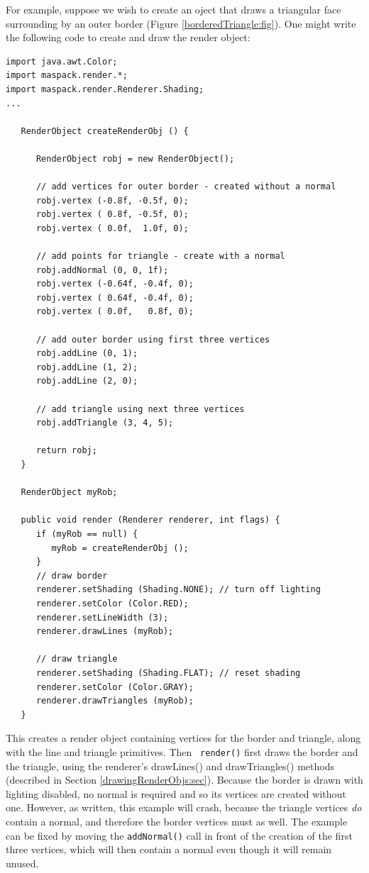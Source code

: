For example, suppose we wish to create an oject that draws a
triangular face surrounding by an outer border (Figure
\ref{borderedTriangle:fig}). One might write the following code to
create and draw the render object:
%
\begin{lstlisting}[]
import java.awt.Color;
import maspack.render.*;
import maspack.render.Renderer.Shading;
...

   RenderObject createRenderObj () {
                  
      RenderObject robj = new RenderObject();
      
      // add vertices for outer border - created without a normal
      robj.vertex (-0.8f, -0.5f, 0);
      robj.vertex ( 0.8f, -0.5f, 0);
      robj.vertex ( 0.0f,  1.0f, 0);
   
      // add points for triangle - create with a normal
      robj.addNormal (0, 0, 1f);
      robj.vertex (-0.64f, -0.4f, 0);
      robj.vertex ( 0.64f, -0.4f, 0);
      robj.vertex ( 0.0f,   0.8f, 0);
   
      // add outer border using first three vertices
      robj.addLine (0, 1);
      robj.addLine (1, 2);
      robj.addLine (2, 0);
   
      // add triangle using next three vertices
      robj.addTriangle (3, 4, 5);
   
      return robj;         
   }
   
   RenderObject myRob;
   
   public void render (Renderer renderer, int flags) {
      if (myRob == null) {
         myRob = createRenderObj ();
      }
      // draw border
      renderer.setShading (Shading.NONE); // turn off lighting
      renderer.setColor (Color.RED);
      renderer.setLineWidth (3);
      renderer.drawLines (myRob);
   
      // draw triangle
      renderer.setShading (Shading.FLAT); // reset shading
      renderer.setColor (Color.GRAY);
      renderer.drawTriangles (myRob);
   }
\end{lstlisting}
%
This creates a render object containing vertices for the border and
triangle, along with the line and triangle primitives. Then {\tt
render()} first draws the border and the triangle, using the
renderer's
%
{drawLines()} and
%
{drawTriangles()} methods (described in Section
\ref{drawingRenderObjs:sec}).  Because the border is drawn with
lighting disabled, no normal is required and so its vertices are
created without one. However, as written, this example will crash,
because the triangle vertices {\it do} contain a normal, and therefore
the border vertices must as well. The example can be fixed by moving
the {\tt addNormal()} call in front of the creation of the first three
vertices, which will then contain a normal even though it will remain
unused.

